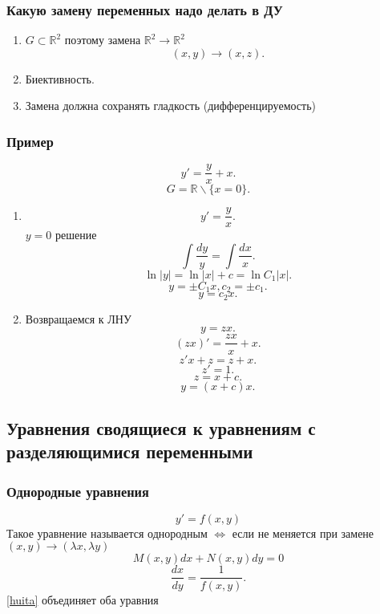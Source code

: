 \documentclass[14pt]{extarticle}
\begin{document}
\subsubsection{Какую замену переменных надо делать в ДУ}
\begin{enumerate}
	\item $G \subset \mathbb{R}^2$ поэтому замена $\mathbb{R}^2 \to \mathbb{R}^2$
	      \[
		      (x,y) \to (x,z)
		      .\]
	\item Биективность.
	\item Замена должна сохранять гладкость (дифференцируемость)
\end{enumerate}
\subsubsection{Пример}
\[
	y' = \frac{y}{x} + x
	.\]
\[
	G = \mathbb{R} \backslash \{x=0\}
	.\]
\begin{enumerate}
	\item
	      \[
		      y' = \frac{y}{x}
		      .\]
	      $y = 0$ решение
	      \[
		      \int \frac{dy}{y} = \int \frac{dx}{x}
		      .\]
	      \[
		      \ln{|y|} = \ln{|x|} + c = \ln{C_1 |x|}
		      .\]
	      \[
		      y = \pm C_1 x , c_2 = \pm c_1
		      .\]
	      \[
		      y = c_2 x
		      .\]
	\item
	      Возвращаемся к ЛНУ
	      \[
		      y = z x
		      .\]
	      \[
		      (z x)' = \frac{z x}{x} + x
		      .\]
	      \[
		      z' x + z = z + x
		      .\]
	      \[
		      z' = 1
		      .\]
	      \[
		      z = x + c
		      .\]
	      \[
		      y = (x + c) x
		      .\]
\end{enumerate}
\subsection{Уравнения сводящиеся к уравнениям с разделяющимися переменными}
\subsubsection{Однородные уравнения}
\begin{equation}\label{ou}
	y' = f(x,y)
\end{equation}
Такое уравнение называется однородным $\iff$ если не меняется при замене  $(x,y) \to  (\lambda x,\lambda y) $
\begin{equation} \label{huita}
	M(x,y) dx + N(x,y) dy = 0
\end{equation}
\[
	\frac{dx}{dy} = \frac{1}{f(x,y)}
	.\]
\ref{huita} объединяет оба уравния
\end{document}
